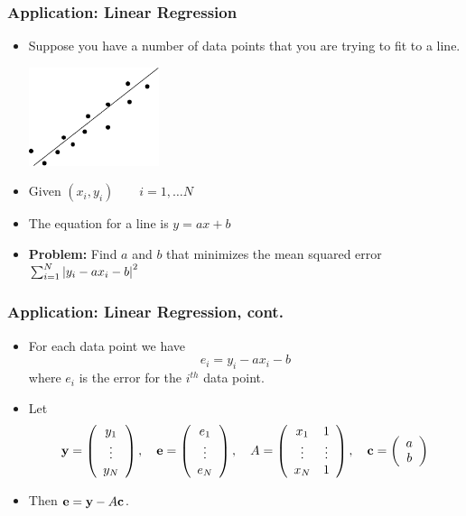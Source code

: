 \documentclass{beamer}
\begin{document}
\begin{frame}\frametitle{Application: Linear Regression}
	\begin{itemize}
	\item Suppose you have a number of data points that you are trying to fit to a line.
		\begin{center}
		\includegraphics[width=1.5in]{figures/chap3_linear_regression}
		\end{center}
		
	\item Given $(x_i, y_i) \qquad i = 1,\ldots N$
	
	\item The equation for a line is $y = ax + b$
	\item {\bf Problem:}  Find $a$ and $b$ that minimizes the mean squared error $\sum_{i=1}^N \left|y_i - ax_i - b\right|^2$
	\end{itemize}	
\end{frame}
 
\begin{frame}\frametitle{Application: Linear Regression, cont.}	
	\begin{itemize}
	\item For each data point we have
	\[ e_i = y_i - ax_i - b \]
	where $e_i$ is the error for the $i^{th}$ data point.  
	
	\item Let
	\[ \mathbf{y} = \left( \begin{array}{c} y_1\\ \vdots \\ y_N \end{array}
	\right), \quad 
	\mathbf{e} = \left( \begin{array}{c} e_1 \\ \vdots \\
	e_N \end{array} \right), \quad
	A = \left( \begin{array}{cc} x_1 & 1
	\\ \vdots & \vdots \\ x_N & 1 \end{array} \right), \quad
	\mathbf{c}
	= \left( \begin{array}{c} a \\ b \end{array} \right) \]
	
	\item Then $\mathbf{e} = \mathbf{y}-A\mathbf{c}$.
	\end{itemize}	
\end{frame}
 
\end{document}
